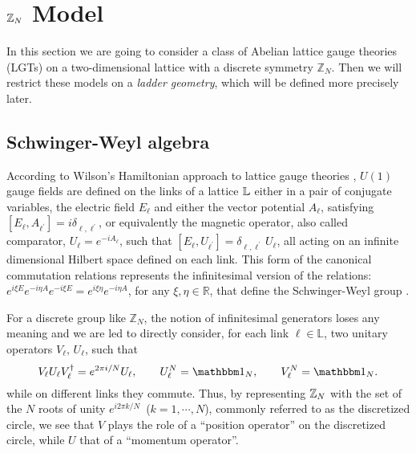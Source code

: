 \section{\texorpdfstring{$\mathbb{Z}_N$}{Z\_N} Model}%
\label{sec:model}
In this section we are going to consider a class of Abelian lattice gauge theories (LGTs) on a two-dimensional lattice
with a discrete symmetry $\mathbb Z_N$. Then we will restrict these models on a \emph{ladder geometry},
which will be defined more precisely later.

\subsection{Schwinger-Weyl algebra}%
\label{sub:schwinger_weyl_algebra}

According to Wilson's Hamiltonian approach to lattice gauge theories \cite{wilson1974confinement}, $U(1)$ gauge fields are defined on
the links of a lattice $\mathbb{L}$  either in a pair of conjugate variables,
the electric field  $E_\ell$ and either the vector potential $A_\ell$, satisfying  $[E_\ell, A_{\ell^{\prime}} ] = i \delta_{\ell , \ell^{\prime} }$, or equivalently the magnetic operator, also called comparator,
$U_\ell = e^{-i A_{\ell} }$, such that $[E_\ell, U_{\ell^{\prime} } ] =  \delta_{\ell , \ell^{\prime} } \, U_{\ell}$, all acting on an infinite dimensional Hilbert space defined on each link.
This form of the canonical commutation relations represents the infinitesimal version of the relations: $ e^{i\xi E} e^{-i\eta A } e^{-i\xi E} = e^{i\xi \eta} e^ {-i\eta A }$,
for any $\xi, \eta \in \mathbb{R}$,
that define the Schwinger-Weyl group \cite{notarnicola2015discrete, ercolessi2018znmodels, schwinger1960unitary}.

For a discrete group like $\mathbb Z_N$, the notion of infinitesimal generators loses any meaning and we are led to directly consider, for each link $\ell \in \mathbb L$, two unitary operators
$V_\ell, \, U_\ell$, such that \cite{schwinger1960unitary, schwinger2001symbolism}
\begin{equation}
    V_\ell U_\ell V_\ell^{\dagger}=e^{2\pi i/N}U_\ell, \qquad
    U_\ell^N=\identity_N, \qquad
    V_\ell^N=\identity_N.
    \label{eq:schwinger_weyl_algebra}
\end{equation}
while on different links they commute.
Thus, by representing $\mathbb{Z}_N$  with the set of the $N$ roots of unity $e^{i 2 \pi k/N}$\, ($k=1, \cdots, N$), commonly referred to as the discretized circle,
we see that $V$ plays the role of a ``position operator'' on the discretized circle, while $U$ that of a ``momentum operator''.

